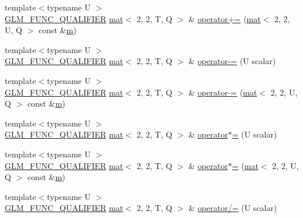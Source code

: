 \begin{DoxyCompactItemize}
\item 
{\footnotesize template$<$typename U $>$ }\\\hyperlink{setup_8hpp_a33fdea6f91c5f834105f7415e2a64407}{G\+L\+M\+\_\+\+F\+U\+N\+C\+\_\+\+Q\+U\+A\+L\+I\+F\+I\+ER} \hyperlink{structglm_1_1mat}{mat}$<$ 2, 2, T, Q $>$ \& \hyperlink{structglm_1_1mat_3_012_00_012_00_01_t_00_01_q_01_4_ac200613a912b6413704bf8aa5677825c}{operator+=} (\hyperlink{structglm_1_1mat}{mat}$<$ 2, 2, U, Q $>$ const \&\hyperlink{_s_d_l__opengl__glext_8h_af593500c283bf1a787a6f947f503a5c2}{m})
\item 
{\footnotesize template$<$typename U $>$ }\\\hyperlink{setup_8hpp_a33fdea6f91c5f834105f7415e2a64407}{G\+L\+M\+\_\+\+F\+U\+N\+C\+\_\+\+Q\+U\+A\+L\+I\+F\+I\+ER} \hyperlink{structglm_1_1mat}{mat}$<$ 2, 2, T, Q $>$ \& \hyperlink{structglm_1_1mat_3_012_00_012_00_01_t_00_01_q_01_4_ad8f70b802e239d71a22c436849401a66}{operator-\/=} (U scalar)
\item 
{\footnotesize template$<$typename U $>$ }\\\hyperlink{setup_8hpp_a33fdea6f91c5f834105f7415e2a64407}{G\+L\+M\+\_\+\+F\+U\+N\+C\+\_\+\+Q\+U\+A\+L\+I\+F\+I\+ER} \hyperlink{structglm_1_1mat}{mat}$<$ 2, 2, T, Q $>$ \& \hyperlink{structglm_1_1mat_3_012_00_012_00_01_t_00_01_q_01_4_aeecbe99c8dd463d2a57ddd006608f5d0}{operator-\/=} (\hyperlink{structglm_1_1mat}{mat}$<$ 2, 2, U, Q $>$ const \&\hyperlink{_s_d_l__opengl__glext_8h_af593500c283bf1a787a6f947f503a5c2}{m})
\item 
{\footnotesize template$<$typename U $>$ }\\\hyperlink{setup_8hpp_a33fdea6f91c5f834105f7415e2a64407}{G\+L\+M\+\_\+\+F\+U\+N\+C\+\_\+\+Q\+U\+A\+L\+I\+F\+I\+ER} \hyperlink{structglm_1_1mat}{mat}$<$ 2, 2, T, Q $>$ \& \hyperlink{structglm_1_1mat_3_012_00_012_00_01_t_00_01_q_01_4_abd40e7f277b38fb6d4bc253c5750ac22}{operator$\ast$=} (U scalar)
\item 
{\footnotesize template$<$typename U $>$ }\\\hyperlink{setup_8hpp_a33fdea6f91c5f834105f7415e2a64407}{G\+L\+M\+\_\+\+F\+U\+N\+C\+\_\+\+Q\+U\+A\+L\+I\+F\+I\+ER} \hyperlink{structglm_1_1mat}{mat}$<$ 2, 2, T, Q $>$ \& \hyperlink{structglm_1_1mat_3_012_00_012_00_01_t_00_01_q_01_4_a1abaf7d5f1778b770aea62171ba17a29}{operator$\ast$=} (\hyperlink{structglm_1_1mat}{mat}$<$ 2, 2, U, Q $>$ const \&\hyperlink{_s_d_l__opengl__glext_8h_af593500c283bf1a787a6f947f503a5c2}{m})
\item 
{\footnotesize template$<$typename U $>$ }\\\hyperlink{setup_8hpp_a33fdea6f91c5f834105f7415e2a64407}{G\+L\+M\+\_\+\+F\+U\+N\+C\+\_\+\+Q\+U\+A\+L\+I\+F\+I\+ER} \hyperlink{structglm_1_1mat}{mat}$<$ 2, 2, T, Q $>$ \& \hyperlink{structglm_1_1mat_3_012_00_012_00_01_t_00_01_q_01_4_a00e71864537d53ed26be1183b6930117}{operator/=} (U scalar)

\end{DoxyCompactItemize}
